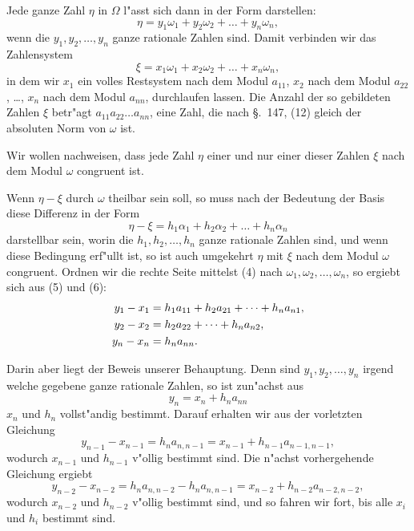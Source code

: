\documentclass[12pt,a4paper]{article}
\theoremstyle{definition}
\begin{document}
Jede ganze Zahl $\eta$ in $\Omega$ l"asst sich dann in der Form darstellen:
\begin{equation}
\eta = y_1\omega_1 + y_2\omega_2 + \dots + y_n\omega_n,
\end{equation}
wenn die $y_1, y_2, \dots, y_n$ ganze rationale Zahlen sind. Damit verbinden wir das Zahlensystem
\begin{equation}
\xi = x_1\omega_1 + x_2\omega_2 + \dots + x_n\omega_n,
\end{equation}
in dem wir $x_1$ ein volles Restsystem nach dem Modul $a_{11}$, $x_2$ nach dem Modul $a_{22}$, \dots, $x_n$ nach dem Modul $a_{nn}$, durchlaufen lassen. Die Anzahl der so gebildeten Zahlen $\xi$ betr"agt $a_{11} a_{22} \dots a_{nn}$, eine Zahl, die nach \S.~147, (12) gleich der absoluten Norm von $\omega$ ist.

Wir wollen nachweisen, dass jede Zahl $\eta$ einer und nur einer dieser Zahlen $\xi$ nach dem Modul $\omega$ congruent ist.

Wenn $\eta - \xi$ durch $\omega$ theilbar sein soll, so muss nach der Bedeutung der Basis diese Differenz in der Form
\begin{equation}
\eta - \xi = h_1\alpha_1 + h_2\alpha_2 + \dots + h_n\alpha_n
\end{equation}
darstellbar sein, worin die $h_1, h_2, \dots, h_n$ ganze rationale Zahlen sind, und wenn diese Bedingung erf"ullt ist, so ist auch umgekehrt $\eta$ mit $\xi$ nach dem Modul $\omega$ congruent. Ordnen wir die rechte Seite mittelst (4) nach $\omega_1, \omega_2, \dots, \omega_n$, so ergiebt sich aus (5) und (6):
\begin{align}
y_1 - x_1 &= h_1 a_{11} + h_2 a_{21} + \dots + h_n a_{n1}, \notag \\
y_2 - x_2 &= h_2 a_{22} + \dots + h_n a_{n2}, \\
y_n - x_n &= h_n a_{nn}. \notag
\end{align}

Darin aber liegt der Beweis unserer Behauptung. Denn sind $y_1, y_2, \dots, y_n$ irgend welche gegebene ganze rationale Zahlen, so ist zun"achst aus
\begin{equation}
y_n = x_n + h_n a_{nn}
\end{equation}
$x_n$ und $h_n$ vollst"andig bestimmt. Darauf erhalten wir aus der vorletzten Gleichung
\begin{equation}
y_{n-1} - x_{n-1} = h_n a_{n,n-1} = x_{n-1} + h_{n-1} a_{n-1,n-1},
\end{equation}
wodurch $x_{n-1}$ und $h_{n-1}$ v"ollig bestimmt sind. Die n"achst vorhergehende Gleichung ergiebt
\begin{equation}
y_{n-2} - x_{n-2} = h_n a_{n,n-2} - h_n a_{n,n-1} = x_{n-2} + h_{n-2} a_{n-2,n-2},
\end{equation}
wodurch $x_{n-2}$ und $h_{n-2}$ v"ollig bestimmt sind, und so fahren wir fort, bis alle $x_i$ und $h_i$ bestimmt sind.
\end{document}

